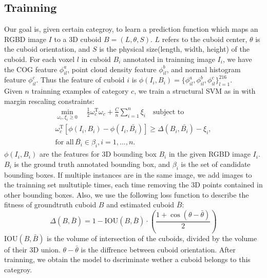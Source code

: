 \documentclass[english]{ccdconf}
\begin{document}
\subsection{Trainning}
\label{Train}
Our goal is, given certain categroy, to learn a prediction function which maps an RGBD image $I$ to a 3D cuboid $B=(L,\theta,S)$. $L$ refers to the cuboid center, $\theta$ is the cuboid orientation, and $S$ is the physical size(length, width, height) of the cuboid.
For each voxel $l$ in cuboid $B_i$ annotated in trainning image $I_i$, we have the COG feature $\phi_{il}^a$, point cloud density feature $\phi_{il}^b$, and normal histogram feature $\phi_{il}^c$. Thus the feature of cuboid $i$ is $\phi(I_i, B_i)=\{\phi_{il}^a, \phi_{il}^b, \phi_{il}^c\}_{l=1}^{216}$. \\
Given $n$ trainning examples of category $c$, we train a structural SVM\cite{joachims2009cutting} as in \cite{ren2016three} with margin rescaling constraints:
\begin{equation}
\begin{aligned}
	\min_{\omega_c, \xi_i \geq 0} \quad
	\frac{1}{2} \omega_c^\mathrm{T} \omega_c + \frac{C}{n}\sum_{i=1}^{n} \xi_i \quad \textrm{subject to}\\
	\omega_c^\mathrm{T}[\phi(I_i,B_i)-\phi(I_i, \bar{B_i})] \geq \Delta (B_i, \bar{B_i}) - \xi_i,\\
	\textrm{for all} \, \bar{B_i} \in \beta_i , i=1,...,n.
\end{aligned}
\end{equation} 
$\phi(I_i, B_i)$ are the features for 3D bounding box $B_i$ in the given RGBD image $I_i$. $B_i$ is the ground truth annotated bounding box, and $\beta_i$ is the set of candidate bounding boxes. If multiple instances are in the same image, we add images to the trainning set multutiple times, each time removing the 3D points contained in other bounding boxes.
Also, we use the following loss function to describe the fitness of groundtruth cuboid $B$
and estimated cuboid $\bar{B}$:
\begin{equation}
 \Delta (B, \bar{B}) = 1 - \textrm{IOU} \left(B, \bar{B}\right) \cdot (\frac{1+\cos(\theta - \bar{\theta})}{2})
\end{equation}
$\textrm{IOU} (B, \bar{B})$ is the volume of intersection of the cuboids, divided by the volume of their 3D union. $\theta - \bar{\theta}$ is the diffrence between cuboid orientation. After trainning, we obtain the model to dscriminate wether a cuboid belongs to this categroy.
\end{document}
